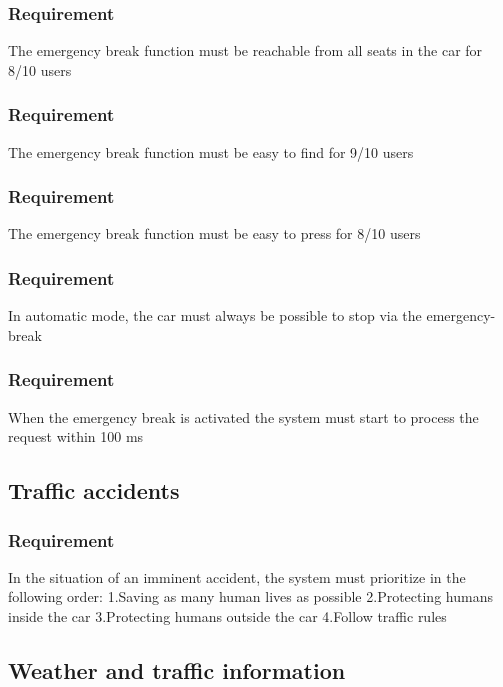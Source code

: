 \documentclass{article}
\begin{document}
      \subsubsection{Requirement}
\hfill \break 
\- \- \-The emergency break function must be reachable from all seats in the car for 8/10 users
      \subsubsection{Requirement}
\hfill \break 
\- \- \-The emergency break function must be easy to find for 9/10 users
      \subsubsection{Requirement}
\hfill \break 
\- \- \-The emergency break function must be easy to press for 8/10 users
      \subsubsection{Requirement}
\hfill \break 
\- \- \-In automatic mode, the car must always be possible to stop via the emergency-break
      \subsubsection{Requirement}
\hfill \break 
\- \- \-When the emergency break is activated the system must start to process the request within 100 ms
  \subsection{Traffic accidents}
      \subsubsection{Requirement}
\hfill \break 
In the situation of an imminent accident, the system must prioritize in the following order:
\hfill \break 
\indent
1.Saving as many human lives as possible
\hfill \break 
\indent
2.Protecting humans inside the car
\hfill \break 
\indent
3.Protecting humans outside the car
\hfill \break 
\indent
4.Follow traffic rules
  \subsection{Weather and traffic information}
\end{document}
